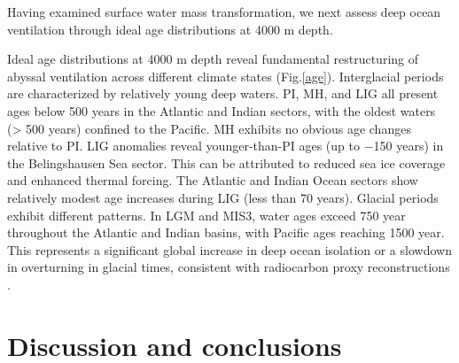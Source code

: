 \documentclass[draft]{agujournal2025}
\begin{document}
Having examined surface water mass transformation, we next assess deep ocean ventilation through ideal age distributions at 4000 m depth.


Ideal age distributions at 4000 m depth reveal fundamental restructuring of abyssal ventilation across different climate states (Fig.\ref{age}). Interglacial periods are characterized by relatively young deep waters. PI, MH, and LIG all present ages below 500 years in the Atlantic and Indian sectors, with the oldest waters (> 500 years) confined to the Pacific.  MH exhibits no obvious age changes relative to PI. LIG anomalies reveal younger-than-PI ages (up to $-$150 years) in the Belingshausen Sea sector. This can be attributed to reduced sea ice coverage and enhanced thermal forcing. The Atlantic and Indian Ocean sectors show relatively modest age increases during LIG (less than 70 years). Glacial periods exhibit different patterns. In LGM and MIS3, water ages exceed 750 year throughout the Atlantic and Indian basins, with Pacific ages reaching 1500 year. This represents a significant global increase in deep ocean isolation or a slowdown in overturning in glacial times, consistent with radiocarbon proxy reconstructions \citep{Skinner2017}.





\section{Discussion and conclusions}
\end{document}
